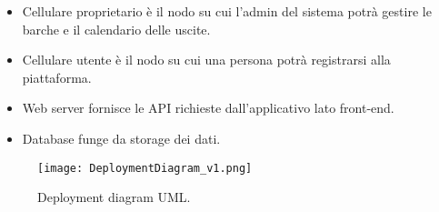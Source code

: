 \begin{itemize}
    \item Cellulare proprietario è il nodo su cui l'admin del sistema potrà gestire le barche e il calendario delle uscite.
    \item Cellulare utente è il nodo su cui una persona potrà registrarsi alla piattaforma.
    \item Web server fornisce le API richieste dall'applicativo lato front-end.
    \item Database funge da storage dei dati.
\end{itemize}

\begin{figure}[h]
    \centering
    \texttt{[image: DeploymentDiagram\_v1.png]}
    \caption{Deployment diagram UML.}\label{fig:deploymentDiagram}
\end{figure}